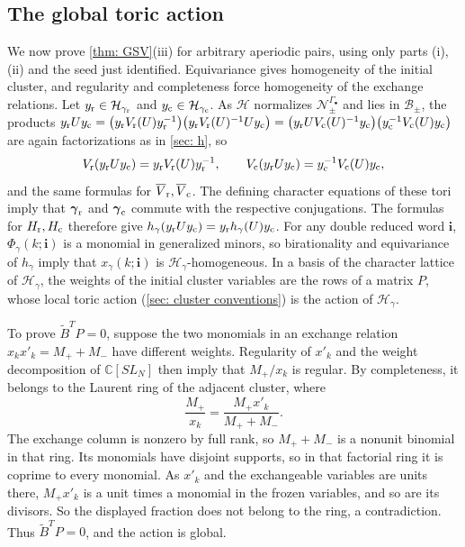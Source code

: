 \documentclass[a4paper]{amsart}
\numberwithin{equation}{section}
\theoremstyle{definition}
\theoremstyle{remark}
\newcommand{\bbC}{\mathbb{C}}
\newcommand{\mcH}{\mathcal{H}}
\newcommand{\mcN}{\mathcal{N}}
\newcommand{\mcB}{\mathcal{B}}
\newcommand{\bfi}{\mathbf{i}}
\newcommand{\tB}{\widetilde{B}}
\newcommand{\rr}{{\rm r}}
\newcommand{\cc}{{\rm c}}
\begin{document}
\subsection{The global toric action}
\label{sec: toric A concise}
We now prove \cref{thm: GSV}(iii) for arbitrary aperiodic pairs, using only parts (i), (ii) and the seed just identified.
Equivariance gives homogeneity of the initial cluster, and regularity and completeness force homogeneity of the exchange relations.
Let $y_{\rr}\in\mcH_{\gamma_{\rr}}$ and $y_{\cc}\in\mcH_{\gamma_{\cc}}$.
As $\mcH$ normalizes $\mcN_\pm^{\Gamma_\bullet}$ and lies in $\mcB_\pm$, the products $y_{\rr}Uy_{\cc}=\big(y_{\rr}V_{\rr}(U)y_{\rr}^{-1}\big)\big(y_{\rr}V_{\rr}(U)^{-1}Uy_{\cc}\big)=\big(y_{\rr}UV_{\cc}(U)^{-1}y_{\cc}\big)\big(y_{\cc}^{-1}V_{\cc}(U)y_{\cc}\big)$ are again factorizations as in \cref{sec: h}, so
\[
  V_{\rr}(y_{\rr}Uy_{\cc})=y_{\rr}V_{\rr}(U)y_{\rr}^{-1},\qquad V_{\cc}(y_{\rr}Uy_{\cc})=y_{\cc}^{-1}V_{\cc}(U)y_{\cc},
\]
and the same formulas for $\overline{V}_{\rr},\overline{V}_{\cc}$.
The defining character equations of these tori imply that $\boldsymbol\gamma_{\rr}$ and $\boldsymbol\gamma_{\cc}$ commute with the respective conjugations.
The formulas for $H_{\rr},H_{\cc}$ therefore give $h_\gamma(y_{\rr}Uy_{\cc})=y_{\rr}h_\gamma(U)y_{\cc}$.
For any double reduced word $\bfi$, $\Phi_\gamma(k;\bfi)$ is a monomial in generalized minors, so birationality and equivariance of $h_\gamma$ imply that $x_\gamma(k;\bfi)$ is $\mcH_\gamma$-homogeneous.
In a basis of the character lattice of $\mcH_\gamma$, the weights of the initial cluster variables are the rows of a matrix $P$, whose local toric action (\cref{sec: cluster conventions}) is the action of $\mcH_\gamma$.

To prove $\tB^TP=0$, suppose the two monomials in an exchange relation $x_kx'_k=M_++M_-$ have different weights.
Regularity of $x'_k$ and the weight decomposition of $\bbC[SL_N]$ then imply that $M_+/x_k$ is regular.
By completeness, it belongs to the Laurent ring of the adjacent cluster, where
\[
  \frac{M_+}{x_k}=\frac{M_+x'_k}{M_++M_-}.
\]
The exchange column is nonzero by full rank, so $M_++M_-$ is a nonunit binomial in that ring.
Its monomials have disjoint supports, so in that factorial ring it is coprime to every monomial. As $x'_k$ and the exchangeable variables are units there, $M_+x'_k$ is a unit times a monomial in the frozen variables, and so are its divisors.
So the displayed fraction does not belong to the ring, a contradiction.
Thus $\tB^TP=0$, and the action is global.
\end{document}
